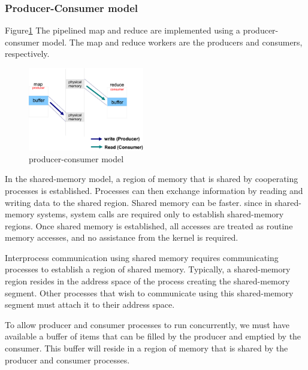 


\subsubsection{Producer-Consumer model}

Figure\ref{fig:dmr:spmc} The pipelined map and reduce are implemented using a
producer-consumer model. The map and reduce workers are
the producers and consumers, respectively.

\begin{figure}[!h!t]
    \centering
    \includegraphics[width=0.45\textwidth]{eps/spmc.eps}
    \caption{producer-consumer model}
    \label{fig:dmr:spmc}
\end{figure}
In the shared-memory model, a region of memory that is shared
by cooperating processes is established. 
Processes can then exchange information 
by reading and writing data to the shared region.
Shared memory can be faster.
since in shared-memory systems, system calls are required only to establish shared-memory regions. 
Once shared memory is established, all accesses are treated
as routine memory accesses, and no assistance from the kernel is required.

Interprocess communication using shared memory requires communicating
processes to establish a region of shared memory. Typically, a shared-memory
region resides in the address space of the process creating the shared-memory
segment. Other processes that wish to communicate using this shared-memory
segment must attach it to their address space. 

To allow producer and consumer processes to run concurrently, we must have
available a buffer of items that can be filled by the producer and emptied by
the consumer. This buffer will reside in a region of memory that is shared by
the producer and consumer processes.

